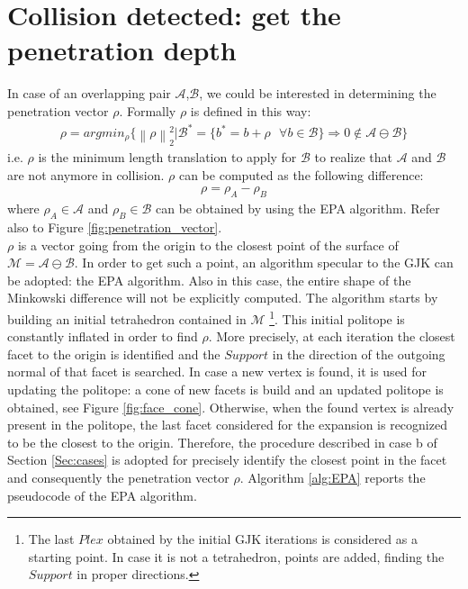 \documentclass{article}
\begin{document}
\section{Collision detected: get the penetration depth}
\label{Sec:penetration}

In case of an overlapping pair $\mathcal{A}$,$\mathcal{B}$, we could be interested in determining the penetration vector $\rho$. Formally $\rho$ is defined in this way:
\begin{eqnarray}
\rho = argmin_{\rho} \bigg \lbrace \left \| \rho \right \|_2^2 \bigg | \mathcal{B}^* = \lbrace b^*=b+\rho \,\,\,\, \forall b \in \mathcal{B} \rbrace \Rightarrow 0 \notin \mathcal{A} \ominus \mathcal{B}  \bigg \rbrace
\end{eqnarray}
i.e. $\rho$ is the minimum length translation to apply for $\mathcal{B}$ to realize that $\mathcal{A}$ and $\mathcal{B}$ are not anymore in collision. $\rho$ can be computed as the following difference:
\begin{eqnarray}
\rho = \rho_A - \rho_B
\end{eqnarray}
where $\rho_A \in \mathcal{A}$ and $\rho_B \in \mathcal{B}$ can be obtained by using the EPA algorithm. Refer also to Figure \ref{fig:penetration_vector}.
\\
$\rho$ is a vector going from the origin to the closest point of the surface of $\mathcal{M} = \mathcal{A} \ominus \mathcal{B}$. In order to get such a point, an algorithm specular to the GJK can be adopted: the EPA algorithm. Also in this case, the entire shape of the Minkowski difference will not be explicitly computed. The algorithm starts by building an initial tetrahedron contained in $\mathcal{M}$ \footnote{The last $Plex$ obtained by the initial GJK iterations is considered as a starting point. In case it is not a tetrahedron, points are added, finding the $Support$ in proper directions. }. This initial politope is constantly inflated in order to find $\rho$. More precisely, at each iteration the closest facet to the origin is identified and the $Support$ in the direction of the outgoing normal of that facet is searched. In case a new vertex is found, it is used for updating the politope: a cone of new facets is build and an updated politope is obtained, see Figure \ref{fig:face_cone}. Otherwise, when the found vertex is already present in the politope, the last facet considered for the expansion is recognized to be the closest to the origin. Therefore, the procedure described in case b of Section \ref{Sec:cases} is adopted for precisely identify the closest point in the facet and consequently the penetration vector $\rho$. Algorithm \ref{alg:EPA} reports the pseudocode of the EPA algorithm. 
\end{document}
